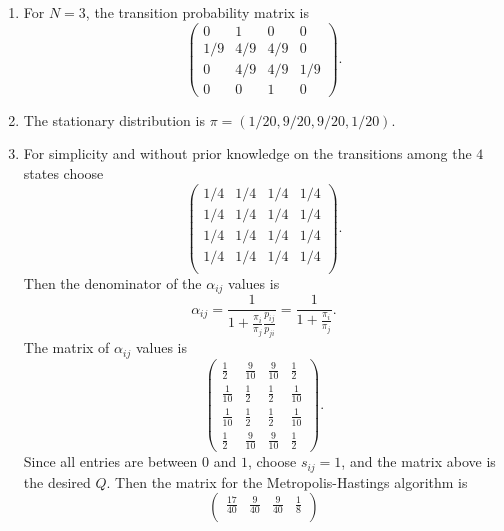 \documentclass[12pt]{article}
\begin{document}
\begin{solution}
    \begin{enumerate}[label=(\alph*)]
    \item
        For \( N = 3 \), the transition probability matrix is
        \[
            \begin{pmatrix}
                0 & 1 & 0 & 0 \\
                1/9 & 4/9 & 4/9 & 0 \\
                0 & 4/9 & 4/9 & 1/9 \\
                0 & 0 & 1 & 0
            \end{pmatrix}
            .
        \]
    \item
        The stationary distribution is \( \pi = (1/20, 9/20, 9/20, 1/20)
        \).
    \item
        For simplicity and without prior knowledge on the transitions
        among the \( 4 \) states choose
        \[
            \begin{pmatrix}
                1/4 & 1/4 & 1/4 & 1/4 \\
                1/4 & 1/4 & 1/4 & 1/4 \\
                1/4 & 1/4 & 1/4 & 1/4 \\
                1/4 & 1/4 & 1/4 & 1/4 \\
            \end{pmatrix}
            .
        \] Then the denominator of the \( \alpha_{ij} \) values is
        \[
            \alpha_{ij} = \frac{1}{1 + \frac{\pi_i}{\pi_j} \frac{p_ {ij}}
            {p_{ji}}} = \frac{1}{1 + \frac{\pi_i}{\pi_j}}.
        \] The matrix of \( \alpha_{ij} \) values is
        \[
            \begin{pmatrix}
                \frac{1}{2} & \frac{9}{10} & \frac{9}{10} & \frac{1}{2}\\
                \frac{1}{10} & \frac{1}{2} & \frac{1}{2} & \frac{1}{10}\\
                \frac{1}{10} & \frac{1}{2} & \frac{1}{2} & \frac{1}{10}\\
                \frac{1}{2} & \frac{9}{10} & \frac{9}{10} & \frac{1}{2}
            \end{pmatrix}
            .
        \] Since all entries are between \( 0 \) and \( 1 \), choose \(
        s_{ij} =1 \), and the matrix above is the desired \( Q \).  Then
        the matrix for the Metropolis-Hastings algorithm is
        \[
            \begin{pmatrix}
                \frac{17}{40} & \frac{9}{40} & \frac{9}{40} & \frac{1}{8}\\

\end{pmatrix}\]
\end{enumerate}
\end{solution}
\end{document}
